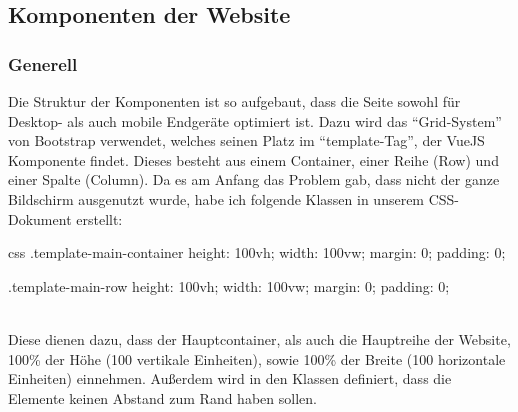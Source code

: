 \newpage
\subsection{Komponenten der Website}
\subsubsection{Generell}
Die Struktur der Komponenten ist so aufgebaut, dass die Seite sowohl für Desktop- als auch mobile Endgeräte optimiert ist. Dazu wird das \enquote{Grid-System} von Bootstrap verwendet, welches seinen Platz im \enquote{template-Tag}, der VueJS Komponente findet. Dieses besteht aus einem Container, einer Reihe (Row) und einer Spalte (Column). Da es am Anfang das Problem gab, dass nicht der ganze Bildschirm ausgenutzt wurde, habe ich folgende Klassen in unserem CSS-Dokument erstellt:
\begin{code}{css}
	.template-main-container {
		height: 100vh;
		width: 100vw;
		margin: 0;
		padding: 0;
	}
	
	.template-main-row {
		height: 100vh;
		width: 100vw;
		margin: 0;
		padding: 0;
	}
\end{code}
	\label{list:cssmaincont} ~\\
Diese dienen dazu, dass der Hauptcontainer, als auch die Hauptreihe der Website, 100\% der Höhe (100 vertikale Einheiten), sowie 100\% der Breite (100 horizontale Einheiten) einnehmen. Außerdem wird in den Klassen definiert, dass die Elemente keinen Abstand zum Rand haben sollen.
\newpage
